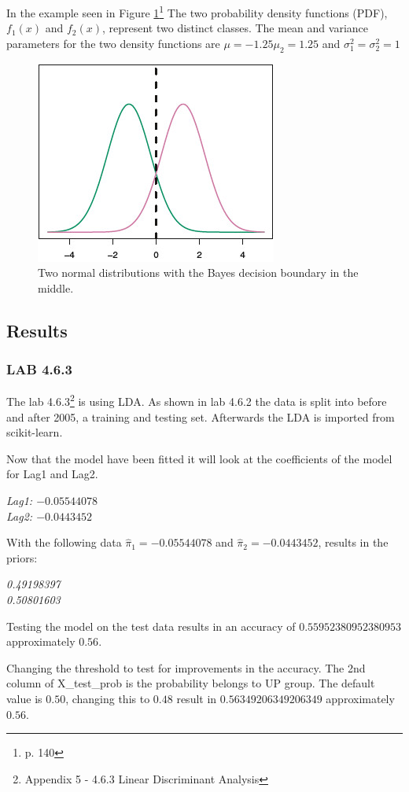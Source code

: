 In the example seen in Figure \ref{fig:TwoOneDimensionalNormalDensityFunctions}\footnote{\cite{James2013} p. 140} The two probability density functions (PDF), $f_1(x)$ and $f_2(x)$, represent two distinct classes. The mean and variance parameters for the two density functions are $\mu=-1.25 \mu_2=1.25$ and $\sigma^2_1=\sigma^2_2=1$
\begin{figure}[H]
	\centering
	\includegraphics[scale=2.0]{discriminantAnalysis/linearDiscriminantAnalysis/fig/TwoOneDimensionalNormalDensityFunctions.jpg}
	\caption{Two normal distributions with the Bayes decision boundary in the middle.}
	\label{fig:TwoOneDimensionalNormalDensityFunctions}
\end{figure}


\subsection{Results}
\subsubsection*{LAB 4.6.3}
The lab 4.6.3\footnote{Appendix 5 - 4.6.3 Linear Discriminant Analysis} is using LDA. As shown in lab 4.6.2 the data is split into before and after 2005, a training and testing set. Afterwards the LDA is imported from scikit-learn.

Now that the model have been fitted it will look at the coefficients of the model for Lag1 and Lag2.

\noindent\textit{Lag1: $-0.05544078$\\
Lag2: $-0.0443452$}

With the following data $\hat{ \pi }_1 = -0.05544078$ and $\hat{ \pi }_2 = -0.0443452 $, results in the priors:%

\noindent\textit{0.49198397\\
0.50801603}

Testing the model on the test data results in an accuracy of $0.55952380952380953$ approximately $0.56$.

Changing the threshold to test for improvements in the accuracy. The 2nd column of X\_test\_prob is the probability belongs to UP group. The default value is $0.50$, changing this to $0.48$ result in $0.56349206349206349$ approximately $0.56$.
